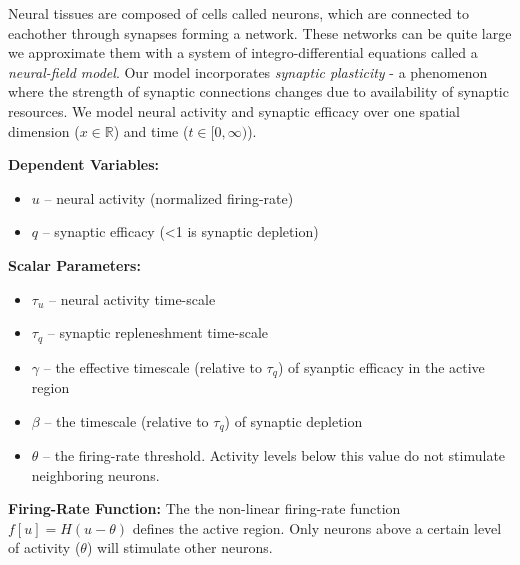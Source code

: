 \documentclass[landscape,final]{baposter}
\newcommand{\RR}{\mathbb{R}}
\begin{document}
\begin{poster}

{
	Neural tissues are composed of cells called neurons, which are connected to eachother through synapses forming a network. These networks can be quite large we approximate them with a system of integro-differential equations called a \textit{neural-field model}. Our model incorporates \textit{synaptic plasticity} - a phenomenon where the strength of synaptic connections changes due to availability of synaptic resources. We model neural activity and synaptic efficacy over one spatial dimension ($x \in \RR$) and time ($t \in [0, \infty)$).
	\bigbreak
	
	\textbf{Dependent Variables:}
		\begin{itemize}
		\item $u$ -- neural activity (normalized firing-rate)
		\item $q$ -- synaptic efficacy (<1 is synaptic depletion)
	\end{itemize}
	\textbf{Scalar Parameters:}
		\begin{itemize}
		\item $\tau_u$ -- neural activity time-scale
		\item $\tau_q$ -- synaptic repleneshment time-scale
		\item $\gamma$ -- the effective timescale (relative to $\tau_q$) of syanptic efficacy in the active region
		\item $\beta$ -- the timescale (relative to $\tau_q$) of synaptic depletion
		\item $\theta$ -- the firing-rate threshold. Activity levels below this value do not stimulate neighboring neurons.
	\end{itemize}
	
	\textbf{Firing-Rate Function:}
	The the non-linear firing-rate function $f[u] = H(u - \theta)$ defines the active region. Only neurons above a certain level of activity ($\theta$) will stimulate other neurons.
	
}
\end{poster}
\end{document}
